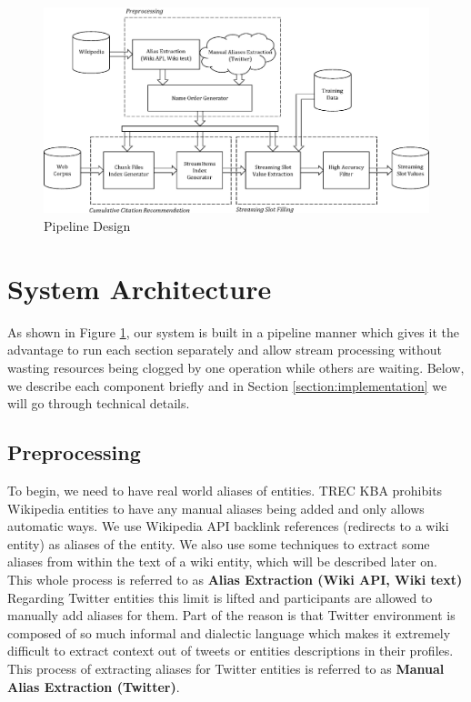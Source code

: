 
\begin{figure}
\centering
\includegraphics[width=6in]{./images/SystemBW.eps}
\vspace*{-.1in} \caption{Pipeline Design }\label{fig:system}
\vspace*{-.2in}
\end{figure}

\section{System Architecture}

As shown in Figure \ref{fig:system}, our system is built in a pipeline manner which gives it the advantage to run each section separately and allow stream processing without wasting resources being clogged by one operation while others are waiting. Below, we describe each component briefly and in Section \ref{section:implementation} we will go through technical details.


\subsection{Preprocessing}

To begin, we need to have real world aliases of entities. TREC KBA prohibits Wikipedia entities to have any manual aliases being added and only allows automatic ways. We use Wikipedia API backlink references (redirects to a wiki entity) as aliases of the entity. We also use some techniques to extract some aliases from within the text of a wiki entity, which will be described later on. This whole process is referred to as \textbf{Alias Extraction (Wiki API, Wiki text)} Regarding Twitter entities this limit is lifted and participants are allowed to manually add aliases for them. Part of the reason is that Twitter environment is composed of so much informal and dialectic language which makes it extremely difficult to extract context out of tweets or entities descriptions in their profiles. This process of extracting aliases for Twitter entities is referred to as \textbf{Manual Alias Extraction (Twitter)}.

